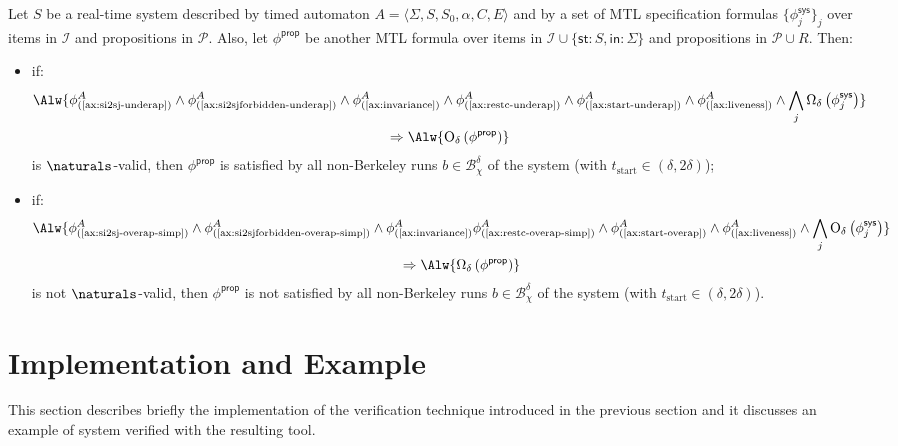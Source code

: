 \documentclass[a4paper]{article}
\newcommand{\tstart}{t_{\mathrm{start}}}
\newcommand{\frf}[1]{(\ref{#1})}
\newcommand{\system}{\phi^{\mathsf{sys}}}
\newcommand{\prop}{\phi^{\mathsf{prop}}}
\newcommand{\overap}[1]{\mathrm{O}_{\delta}\left({#1}\right)}
\newcommand{\underap}[1]{\Omega_{\delta}\left({#1}\right)}
\newcommand{\Ical}{\mathcal{I}}
\newcommand{\Pcal}{\mathcal{P}}
\newcommand{\Bchi}{\mathcal{B}_{\chi}}
\newcommand{\IIT}{\Ical}
\newcommand{\st}{\mathsf{st}}
\newcommand{\inpt}{\mathsf{in}}
\theoremstyle{plain}
\theoremstyle{definition}
\begin{document}
\begin{proposition} \label{prop:summary}
Let $S$ be a real-time system described by timed automaton $A = \langle \Sigma, S, S_0, \alpha, C, E \rangle$ and by a set of MTL specification formulas $\{\system_j\}_{j}$ over items in $\IIT$ and propositions in $\Pcal$.
Also, let $\prop$ be another MTL formula over items in $\IIT \cup \{\st:S, \inpt:\Sigma\}$ and propositions in $\Pcal \cup R$.
Then:
\begin{itemize}
\item if:
 \begin{multline*}
   \Alw{\phi^A_{\textup{\frf{ax:si2sj-underap}}} \wedge \phi^A_{\textup{\frf{ax:si2sjforbidden-underap}}} \wedge \phi^A_{\textup{\frf{ax:invariance}}} \wedge \phi^A_{\textup{\frf{ax:restc-underap}}} \wedge \phi^A_{\textup{\frf{ax:start-underap}}} \wedge \phi^A_{\textup{\frf{ax:liveness}}}  \wedge \bigwedge_{j} \underap{\system_j}}
   \\ \Rightarrow \Alw{\overap{\prop}}
\end{multline*}
is $\naturals$-valid, then $\prop$ is satisfied by all non-Berkeley runs $b \in \Bchi^\delta$ of the system (with $\tstart \in (\delta, 2\delta)$);

\item if:
 \begin{multline*}
   \Alw{\phi^A_{\textup{\frf{ax:si2sj-overap-simp}}} \wedge \phi^A_{\textup{\frf{ax:si2sjforbidden-overap-simp}}} \wedge \phi^A_{\textup{\frf{ax:invariance}}} \phi^A_{\textup{\frf{ax:restc-overap-simp}}} \wedge \phi^A_{\textup{\frf{ax:start-overap}}} \wedge \phi^A_{\textup{\frf{ax:liveness}}} \wedge \bigwedge_{j} \overap{\system_j}}
   \\ \Rightarrow \Alw{\underap{\prop}}
\end{multline*}
is not $\naturals$-valid, then $\prop$ is not satisfied by all non-Berkeley runs $b \in \Bchi^\delta$ of the system (with $\tstart \in (\delta, 2\delta)$).
\end{itemize}
\end{proposition}






\section{Implementation and Example} \label{sec:impl-example}
This section describes briefly the implementation of the verification technique introduced in the previous section and it discusses an example of system verified with the resulting tool.
\end{document}
